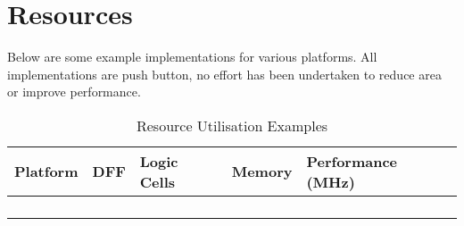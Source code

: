 \chapter{Resources}

Below are some example implementations for various platforms. All implementations are push button, no effort has been undertaken to reduce area or improve performance.

\setlength\LTleft{0pt}
\setlength\LTright{0pt}

\begin{longtable}[]{@{\extracolsep{\fill}}lllll@{}}
	\toprule
		\textbf{Platform} & \textbf{DFF} & \textbf{Logic Cells} &
		\textbf{Memory} & \textbf{Performance (MHz)}\tabularnewline
	\midrule
	\endhead
		& & & &\tabularnewline
		& & & &\tabularnewline
		& & & &\tabularnewline
	\bottomrule
	\caption{Resource Utilisation Examples}
	\label{tab:RESOURCES}
\end{longtable}